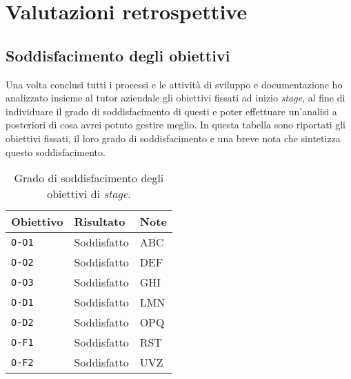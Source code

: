 
\chapter{Valutazioni retrospettive}
\label{cap:valutazioni-retrospettive}

\section{Soddisfacimento degli obiettivi}

Una volta conclusi tutti i processi e le attività di sviluppo e documentazione ho analizzato insieme al tutor aziendale gli obiettivi fissati ad inizio \textit{stage}, al fine di individuare il grado di soddisfacimento di questi e poter effettuare un'analisi a posteriori di cosa avrei potuto gestire meglio. In questa tabella sono riportati gli obiettivi fissati, il loro grado di soddisfacimento e una breve nota che sintetizza questo soddisfacimento. \\

\begin{table}[h]
  \begin{center}
\begin{tabular}{lll}
\textbf{Obiettivo}         & \textbf{Risultato}               & \textbf{Note}            \\ \hline
\multicolumn{1}{|l|}{\texttt{O-O1}} & \multicolumn{1}{l|}{Soddisfatto} & \multicolumn{1}{l|}{ABC} \\ \hline
\multicolumn{1}{|l|}{\texttt{O-O2}} & \multicolumn{1}{l|}{Soddisfatto} & \multicolumn{1}{l|}{DEF} \\ \hline
\multicolumn{1}{|l|}{\texttt{O-O3}} & \multicolumn{1}{l|}{Soddisfatto} & \multicolumn{1}{l|}{GHI} \\ \hline
\multicolumn{1}{|l|}{\texttt{O-D1}} & \multicolumn{1}{l|}{Soddisfatto} & \multicolumn{1}{l|}{LMN} \\ \hline
\multicolumn{1}{|l|}{\texttt{O-D2}} & \multicolumn{1}{l|}{Soddisfatto} & \multicolumn{1}{l|}{OPQ} \\ \hline
\multicolumn{1}{|l|}{\texttt{O-F1}} & \multicolumn{1}{l|}{Soddisfatto} & \multicolumn{1}{l|}{RST} \\ \hline
\multicolumn{1}{|l|}{\texttt{O-F2}} & \multicolumn{1}{l|}{Soddisfatto} & \multicolumn{1}{l|}{UVZ} \\ \hline
\end{tabular}
\end{center}
\caption{Grado di soddisfacimento degli obiettivi di \textit{stage}.}
\end{table}

